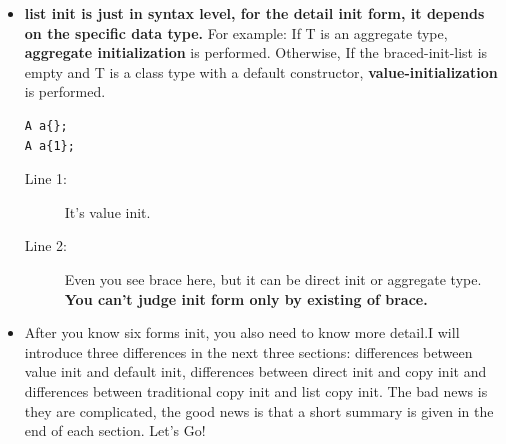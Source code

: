 \documentclass[a4paper,11pt,twoside]{book}
\begin{document}
\begin{itemize}
\item \textbf{list init is just in syntax level, for the detail init form, it depends on the specific data type.}  For example: If T is an aggregate type, \textbf{aggregate initialization} is performed. Otherwise, If the braced-init-list is empty and T is a class type with a default constructor, \textbf{value-initialization} is performed.

\begin{lstlisting}
A a{};
A a{1};
\end{lstlisting}
\begin{description}
	\item[Line 1:] It's value init.
	\item[Line 2:] Even you see brace here, but it can be direct init or aggregate type. \textbf{You can't judge init form only by existing of brace.}
\end{description}

\item After you know six forms init, you also need to know more detail.I will introduce three differences in the next three sections: differences between value init and default init, differences between direct init and copy init and differences between traditional copy init and list copy init. The bad news is they are complicated, the good news is that a short summary is given in the end of each section. Let's Go!
\end{itemize}
\end{document}

